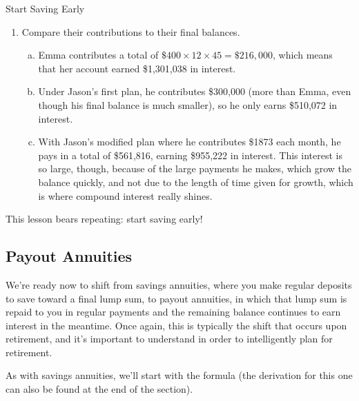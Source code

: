 \begin{example}[https://www.youtube.com/watch?v=9hcZL9uCEoY&list=PLfmpjsIzhztsZtnb7HnXrQ8SLoiOCIcAM&index=28]{Start Saving Early}
\begin{enumerate}[(1)]
To find this out, set $F$ equal to Emma's final total, and solve for $PMT$ using $t=25$:
\begin{align*}
\$1,517,038 &= \dfrac{PMT\left[\left(1+\dfrac{0.07}{12}\right)^{(12)(25)}-1\right]}{\left(\dfrac{0.07}{12}\right)}\\
\boxed{\$1873} &\approx P
\end{align*}
He'd have to save much, much more each month to catch up to Emma, and in total this would mean saving \$561,816 (again, compared to the \$216,000 that Emma saves in total).

\item Compare their contributions to their final balances.
\begin{enumerate}[(a)]
\item Emma contributes a total of $\$400 \times 12 \times 45 = \$216,000$, which means that her account earned \$1,301,038 in interest.
\item Under Jason's first plan, he contributes \$300,000 (more than Emma, even though his final balance is much smaller), so he only earns \$510,072 in interest.
\item With Jason's modified plan where he contributes \$1873 each month, he pays in a total of \$561,816, earning \$955,222 in interest.  This interest is so large, though, because of the large payments he makes, which grow the balance quickly, and not due to the length of time given for growth, which is where compound interest really shines.
\end{enumerate}
\end{enumerate} 
This lesson bears repeating: start saving early!
\end{example}
\vfill
\pagebreak

\subsection{Payout Annuities}
We're ready now to shift from savings annuities, where you make regular deposits to save toward a final lump sum, to payout annuities, in which that lump sum is repaid to you in regular payments and the remaining balance continues to earn interest in the meantime.  Once again, this is typically the shift that occurs upon retirement, and it's important to understand in order to intelligently plan for retirement.

As with savings annuities, we'll start with the formula (the derivation for this one can also be found at the end of the section).

